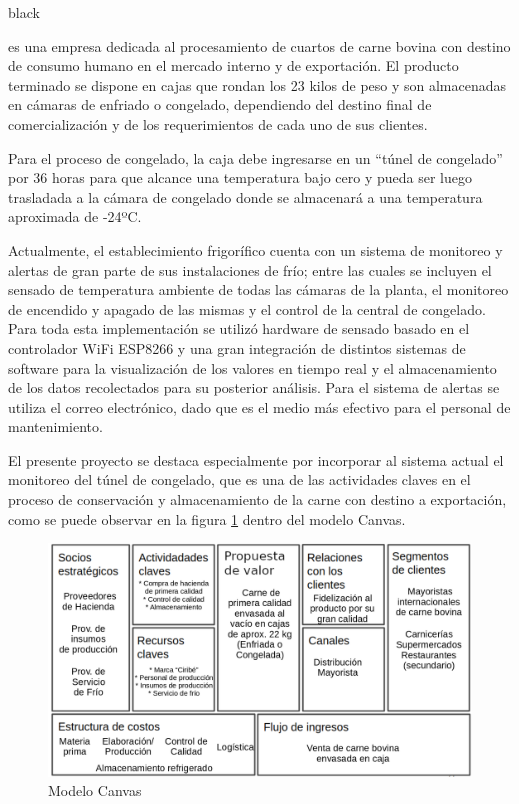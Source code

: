 \documentclass[
11pt, %
]{charter}
\begin{document}
\begin{consigna}{black}

\empclientename es una empresa dedicada al procesamiento de cuartos de carne bovina con destino de consumo humano en el mercado interno y de exportación. El producto terminado se dispone en cajas que rondan los 23 kilos de peso y son almacenadas en cámaras de enfriado o congelado, dependiendo del destino final de comercialización y de los requerimientos de cada uno de sus clientes.

Para el proceso de congelado, la caja debe ingresarse en un “túnel de congelado” por 36 horas para que alcance una temperatura bajo cero y pueda ser luego trasladada a la cámara de congelado donde se almacenará a una temperatura aproximada de -24ºC.

Actualmente, el establecimiento frigorífico cuenta con un sistema de monitoreo y alertas de gran parte de sus instalaciones de frío; entre las cuales se incluyen el sensado de temperatura ambiente de todas las cámaras de la planta, el monitoreo de encendido y apagado de las mismas y el control de la central de congelado. Para toda esta implementación se utilizó hardware de sensado basado en el controlador WiFi ESP8266 y una gran integración de distintos sistemas de software para la visualización de los valores en tiempo real y el almacenamiento de los datos recolectados para su posterior análisis. Para el sistema de alertas se utiliza el correo electrónico, dado que es el medio más efectivo para el personal de mantenimiento.

El presente proyecto se destaca especialmente por incorporar al sistema actual el monitoreo del túnel de congelado, que es una de las actividades claves en el proceso de conservación y almacenamiento de la carne con destino a exportación, como se puede observar en la figura \ref{fig:canvasdone} dentro del modelo Canvas. 

\begin{figure}[htpb]
\centering 
\includegraphics[width=.75\textwidth]{./Figuras/canvasdone.png}
\caption{Modelo Canvas}
\label{fig:canvasdone}
\end{figure}


\end{consigna}
\end{document}

